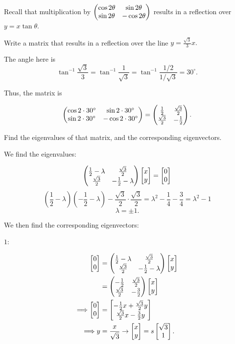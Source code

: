 \documentclass[../gatm_answers.tex]{subfiles}
\begin{document}
\begin{outer_problem}
\item Recall that multiplication by $\begin{pmatrix} \cos 2\theta & \sin 2\theta \\ \sin 2\theta & -\cos 2\theta \end{pmatrix}$ results in a reflection over $y=x\tan \theta$.
\end{outer_problem}

\begin{inner_problem}[start=1]
\item Write a matrix that results in a reflection over the line $y=\frac{\sqrt{3}}{3}x.$
\end{inner_problem}

The angle here is $$\tan^{-1} \frac{\sqrt{3}}{3} = \tan^{-1} \frac{1}{\sqrt{3}} = \tan^{-1} \frac{1/2}{1/\sqrt{3}} = 30^\circ.$$

Thus, the matrix is

$$\begin{pmatrix} \cos 2\cdot 30^\circ & \sin 2\cdot 30^\circ \\ \sin 2\cdot 30^\circ & -\cos 2\cdot 30^\circ \end{pmatrix} = \begin{pmatrix} \frac{1}{2} & \frac{\sqrt{3}}{2} \\ \frac{\sqrt{3}}{2} & -\frac{1}{2} \end{pmatrix}.$$

\begin{inner_problem}
\item Find the eigenvalues of that matrix, and the corresponding eigenvectors.
\end{inner_problem}

We find the eigenvalues:

$$\begin{pmatrix} \frac{1}{2}-\lambda & \frac{\sqrt{3}}{2} \\ \frac{\sqrt{3}}{2} & -\frac{1}{2}-\lambda \end{pmatrix}\begin{bmatrix} x \\ y \end{bmatrix}=\begin{bmatrix} 0 \\ 0 \end{bmatrix}$$
$$\left(\frac{1}{2}-\lambda \right)\left(-\frac{1}{2}-\lambda\right) - \frac{\sqrt{3}}{2}\cdot \frac{\sqrt{3}}{2} = \lambda^2 - \frac{1}{4} - \frac{3}{4} = \lambda^2-1$$
$$\lambda = \pm 1.$$

We then find the corresponding eigenvectors:

$1$:

\begin{align*}
\begin{bmatrix} 0 \\ 0 \end{bmatrix} &= \begin{pmatrix} \frac{1}{2}-\lambda & \frac{\sqrt{3}}{2} \\ \frac{\sqrt{3}}{2} & -\frac{1}{2}-\lambda \end{pmatrix}\begin{bmatrix} x \\ y \end{bmatrix} \\
&= \begin{pmatrix} -\frac{1}{2} & \frac{\sqrt{3}}{2} \\ \frac{\sqrt{3}}{2} & -\frac{3}{2} \end{pmatrix}\begin{bmatrix} x \\ y \end{bmatrix} \\
\Longrightarrow \begin{bmatrix} 0 \\ 0 \end{bmatrix} &= \begin{bmatrix} -\frac{1}{2}x+\frac{\sqrt{3}}{2}y \\ \frac{\sqrt{3}}{2}x-\frac{3}{2}y \end{bmatrix} \\
\Longrightarrow y&=\frac{x}{\sqrt{3}} \rightarrow \begin{bmatrix} x \\ y \end{bmatrix}=s\begin{bmatrix} \sqrt{3} \\ 1 \end{bmatrix}.
\end{align*}
\end{document}
